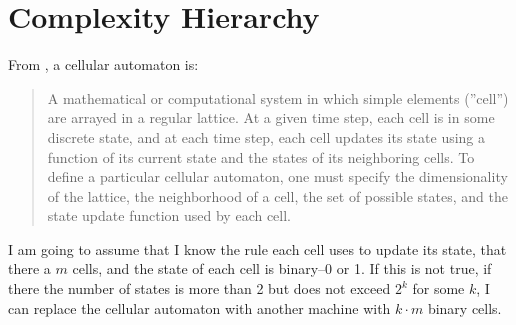 \documentclass[]{article}
\begin{document}
\section{Complexity Hierarchy}

From \cite{sfi2020glossary}, a cellular automaton is: \begin{quotation}
	A mathematical or computational system in which simple elements (''cell'') are arrayed in a regular lattice. At a given time step, each cell is in some discrete state, and at each time step, each cell updates its state using a function of its current state and the states of its neighboring cells. To define a particular cellular automaton, one must specify the dimensionality of the lattice, the neighborhood of a cell, the set of possible states, and the state update function used by each cell. 
\end{quotation}
I am going to assume that I know the rule each cell uses to update its state, that there a $m$ cells, and the state of each cell is binary--0 or 1. If this is not true, if there the number of states is more than 2 but does not exceed $2^k$ for some $k$, I can replace the cellular automaton with another machine with $k\cdot m$ binary cells. 
\end{document}
